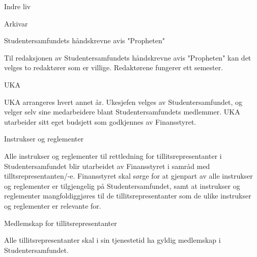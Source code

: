 \documentclass[fsbok.tex]{subfiles}
\begin{document}
\begin{lovkapittel}{Indre liv}
\begin{lovparagraf}{Arkivar}
  \end{lovparagraf}
  
  \begin{lovparagraf}{Studentersamfundets håndskrevne avis "Propheten"}
  
Til redaksjonen av Studentersamfundets håndskrevne avis "Propheten" kan det velges to redaktører som er villige.
Redaktørene fungerer ett semester.
  
  \end{lovparagraf}
  
  \begin{lovparagraf}{UKA}
  
UKA arrangeres hvert annet år. Ukesjefen velges av Studentersamfundet, og velger selv sine medarbeidere blant
Studentersamfundets medlemmer. UKA utarbeider sitt eget budsjett som godkjennes av Finansstyret.

  \end{lovparagraf}
  
  \begin{lovparagraf}{Instrukser og reglementer}
  
Alle instrukser og reglementer til rettledning for tillitsrepresentanter i Studentersamfundet blir utarbeidet av
Finansstyret i samråd med tilltsrepresentanten/-e. Finansstyret skal sørge for at gjenpart av alle instrukser og
reglementer er tilgjengelig på Studentersamfundet, samt at instrukser og reglementer mangfoldiggjøres til de
tillitsrepresentanter som de ulike instrukser og reglementer er relevante for.
  
  \end{lovparagraf}
  
  \begin{lovparagraf}{Medlemskap for tillitsrepresentanter}

Alle tillitsrepresentanter skal i sin tjenestetid ha gyldig medlemskap i Studentersamfundet.

  \end{lovparagraf}

\end{lovkapittel}
\end{document}
